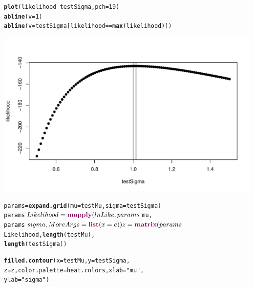 \documentclass[xcolor=dvipsnames]{beamer}\usepackage{graphicx, color}
\makeatletter
\def\maxwidth{ %
  \ifdim\Gin@nat@width>\linewidth
    \linewidth
  \else
    \Gin@nat@width
  \fi
}
\newcommand{\hlfunctioncall}[1]{\textcolor[rgb]{0.501960784313725,0,0.329411764705882}{\textbf{#1}}}%
\newcommand{\hlstring}[1]{\textcolor[rgb]{0.6,0.6,1}{#1}}%
\newenvironment{kframe}{%
 \def\at@end@of@kframe{}%
 \ifinner\ifhmode%
  \def\at@end@of@kframe{\end{minipage}}%
  \begin{minipage}{\columnwidth}%
 \fi\fi%
 \def\FrameCommand##1{\hskip\@totalleftmargin \hskip-\fboxsep
 \colorbox{shadecolor}{##1}\hskip-\fboxsep
     \hskip-\linewidth \hskip-\@totalleftmargin \hskip\columnwidth}%
 \MakeFramed {\advance\hsize-\width
   \@totalleftmargin\z@ \linewidth\hsize
   \@setminipage}}%
 {\par\unskip\endMakeFramed%
 \at@end@of@kframe}
\newenvironment{knitrout}{}{} %
\makeatother
\begin{document}
\begin{frame}[fragile]
\begin{knitrout}
\color{fgcolor}\begin{kframe}
\begin{alltt}
\hlfunctioncall{plot}(likelihood ~ testSigma, pch = 19)
\hlfunctioncall{abline}(v = 1)
\hlfunctioncall{abline}(v = testSigma[likelihood == \hlfunctioncall{max}(likelihood)])
\end{alltt}
\end{kframe}
\includegraphics[width=\maxwidth]{figure/PlotSigma} 

\end{knitrout}

\end{frame}

\begin{frame}[fragile]
\begin{knitrout}
\color{fgcolor}\begin{kframe}
\begin{alltt}
params = \hlfunctioncall{expand.grid}(mu = testMu, sigma = testSigma)
params$Likelihood = \hlfunctioncall{mapply}(lnLike, params$mu, 
    params$sigma, MoreArgs = \hlfunctioncall{list}(x = e))
z = \hlfunctioncall{matrix}(params$Likelihood, \hlfunctioncall{length}(testMu), 
    \hlfunctioncall{length}(testSigma))
\end{alltt}
\end{kframe}
\end{knitrout}

\end{frame}

\begin{frame}[fragile]
\begin{knitrout}
\color{fgcolor}\begin{kframe}
\begin{alltt}
\hlfunctioncall{filled.contour}(x = testMu, y = testSigma, 
    z = z, color.palette = heat.colors, xlab = \hlstring{"mu"}, 
    ylab = \hlstring{"sigma"})
\end{alltt}
\end{kframe}
\end{knitrout}

\end{frame}
\end{document}
